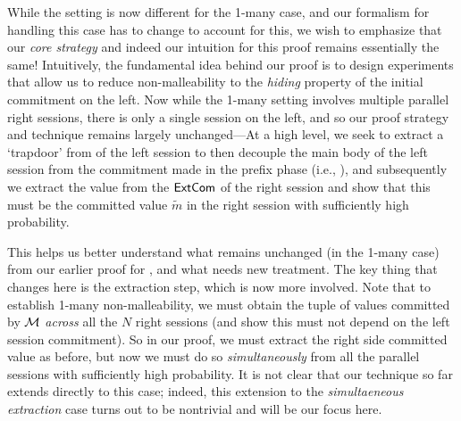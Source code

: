 While the setting is now different for the 1-many case, and our formalism for handling this case has to change to account for this, we wish to emphasize that our {\em core strategy} and indeed our intuition for this proof remains essentially the same! Intuitively, the fundamental idea behind our proof is to design experiments that allow us to reduce non-malleability to the {\em hiding} property of the initial commitment on the left. Now while the 1-many setting involves multiple parallel right sessions, there is only a single session on the left, and so our proof strategy and technique remains largely unchanged---At a high level, we seek to extract a `trapdoor' from  of the left session to then decouple the main body of the left session from the commitment made in the prefix phase (i.e., ), and subsequently we extract the value from the  $\mathsf{ExtCom}$ of the right session and show that this must be the committed value $\tilde{m}$ in the right session with sufficiently high probability. 

This helps us better understand what remains unchanged (in the 1-many case) from our earlier proof for , and what needs new treatment. The key thing that changes here is the extraction step, which is now more involved. Note that to establish 1-many non-malleability, we must obtain the tuple of values committed by $\mathcal{M}$ {\em across} all the $N$ right sessions (and show this must not depend on the left session commitment). So in our proof, we must extract the right side committed value as before, but now we must do so {\em simultaneously} from all the parallel sessions with sufficiently high probability. It is not clear that our technique so far extends directly to this case; indeed, this extension to the {\em simultaeneous extraction} case turns out to be nontrivial and will be our focus here. 

